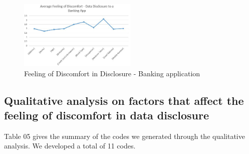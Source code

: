 \documentclass[conference]{IEEEtran}
\begin{document}
\begin{figure}[h]
\begin{center}
\includegraphics[width=0.5\textwidth]{Average_Banking}
\caption{Feeling of Discomfort in Disclosure - Banking application}
\end{center}
\end{figure}





\subsection{Qualitative analysis on factors that affect the feeling of discomfort in data disclosure}

Table 05 gives the summary of the codes we generated through the qualitative analysis. We developed a total of 11 codes.
\end{document}
